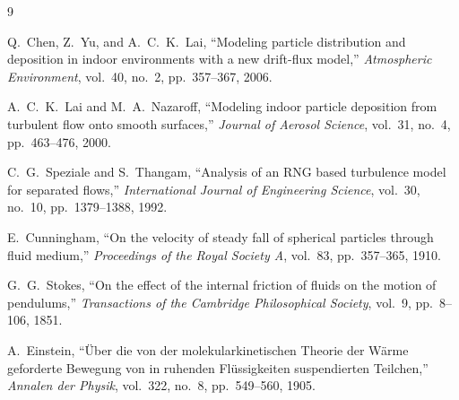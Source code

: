 \documentclass[12pt]{article}
\begin{document}
\begin{thebibliography}{9}

Q.~Chen, Z.~Yu, and A.~C.~K.~Lai, ``Modeling particle distribution and deposition in indoor environments with a new drift-flux model,'' \textit{Atmospheric Environment}, vol.~40, no.~2, pp.~357--367, 2006.

A.~C.~K.~Lai and M.~A.~Nazaroff, ``Modeling indoor particle deposition from turbulent flow onto smooth surfaces,'' \textit{Journal of Aerosol Science}, vol.~31, no.~4, pp.~463--476, 2000.

C.~G.~Speziale and S.~Thangam, ``Analysis of an RNG based turbulence model for separated flows,'' \textit{International Journal of Engineering Science}, vol.~30, no.~10, pp.~1379--1388, 1992.

E.~Cunningham, ``On the velocity of steady fall of spherical particles through fluid medium,'' \textit{Proceedings of the Royal Society A}, vol.~83, pp.~357--365, 1910.

G.~G.~Stokes, ``On the effect of the internal friction of fluids on the motion of pendulums,'' \textit{Transactions of the Cambridge Philosophical Society}, vol.~9, pp.~8--106, 1851.

A.~Einstein, ``\"{U}ber die von der molekularkinetischen Theorie der W\"{a}rme geforderte Bewegung von in ruhenden Fl\"{u}ssigkeiten suspendierten Teilchen,'' \textit{Annalen der Physik}, vol.~322, no.~8, pp.~549--560, 1905.

\end{thebibliography}
\end{document}
